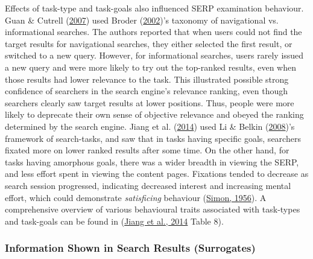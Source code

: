 \documentclass[letterpaper, nobind]{templates/ociamthesis}
\begin{document}
Effects of task-type and task-goals also influenced SERP examination
behaviour. Guan \& Cutrell (\protect\hyperlink{ref-105}{2007}) used Broder (\protect\hyperlink{ref-broder2002taxonomy}{2002})'s taxonomy of navigational vs.
informational searches. The authors reported that when users could not
find the target results for navigational searches, they either selected
the first result, or switched to a new query. However, for informational
searches, users rarely issued a new query and were more likely to try
out the top-ranked results, even when those results had lower relevance
to the task. This illustrated possible strong confidence of searchers in
the search engine's relevance ranking, even though searchers clearly saw
target results at lower positions. Thus, people were more likely to
deprecate their own sense of objective relevance and obeyed the ranking
determined by the search engine. Jiang et al. (\protect\hyperlink{ref-126}{2014}) used Li \& Belkin (\protect\hyperlink{ref-li2008faceted}{2008})'s framework of
search-tasks, and saw that in tasks having specific goals, searchers
fixated more on lower ranked results after some time. On the other hand,
for tasks having amorphous goals, there was a wider breadth in viewing
the SERP, and less effort spent in viewing the content pages. Fixations
tended to decrease as search session progressed, indicating decreased
interest and increasing mental effort, which could demonstrate
\emph{satisficing} behaviour (\protect\hyperlink{ref-simon1956rational}{Simon, 1956}). A comprehensive overview
of various behavioural traits associated with task-types and task-goals
can be found in (\protect\hyperlink{ref-126}{Jiang et al., 2014} Table 8).

\hypertarget{information-shown-in-search-results-surrogates}{%
\subsubsection{Information Shown in Search Results (Surrogates)}\label{information-shown-in-search-results-surrogates}}
\end{document}
